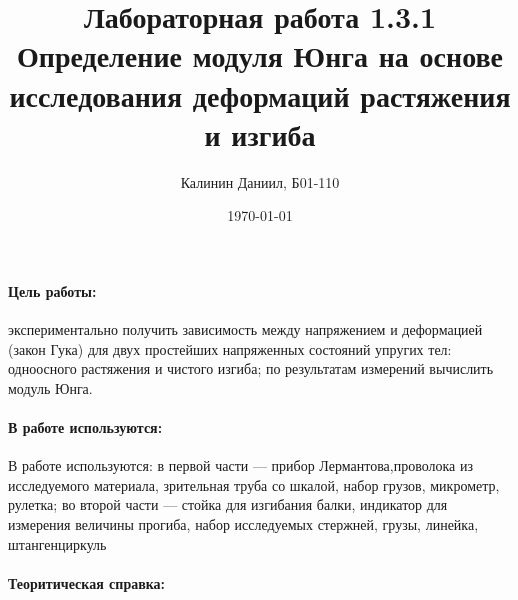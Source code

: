 \documentclass[a4paper, 12pt]{article}
\author{Калинин Даниил, Б01-110}
\date{\today}
\title{Лабораторная работа 1.3.1\\Определение модуля Юнга на основе исследования деформаций растяжения и изгиба}
\newcommand{\parag}[1]{\paragraph*{#1:}}
\begin{document}
\maketitle

\parag {Цель работы}
экспериментально получить зависимость между напряжением и деформацией (закон Гука) для двух простейших напряженных состояний упругих тел: одноосного растяжения и чистого изгиба; по результатам измерений вычислить модуль Юнга.

\parag {В работе используются}
В работе используются: в первой части — прибор Лермантова,проволока из исследуемого материала, зрительная труба со шкалой, набор грузов, микрометр, рулетка; во второй части — стойка для изгибания балки, индикатор для измерения величины прогиба, набор исследуемых стержней, грузы, линейка, штангенциркуль

\parag {Теоритическая справка} ~\\
\end{document}
